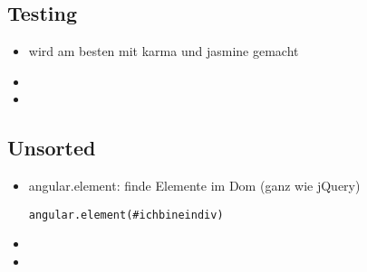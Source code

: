\subsection{Testing}
\begin{itemize}
  \item wird am besten mit karma und jasmine gemacht
  \item
  \item
\end{itemize}


\subsection{Unsorted}
\begin{itemize}
  \item angular.element: finde Elemente im Dom (ganz wie jQuery)
    \begin{verbatim}
angular.element(#ichbineindiv)
    \end{verbatim}
  \item
  \item
\end{itemize}





